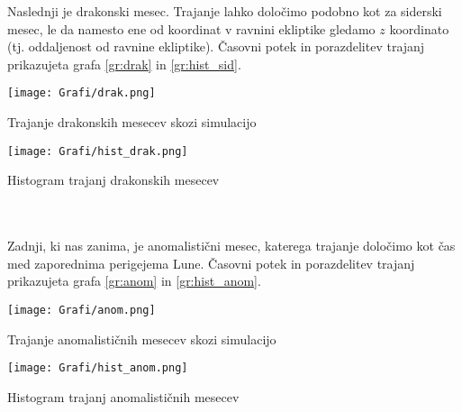 \documentclass{article}
\begin{document}
Naslednji je drakonski mesec. Trajanje lahko določimo podobno kot za siderski mesec, le da namesto ene od koordinat v ravnini ekliptike gledamo $z$ koordinato (tj. oddaljenost od ravnine ekliptike). Časovni potek in porazdelitev trajanj prikazujeta grafa \ref{gr:drak} in \ref{gr:hist_sid}.

\begin{minipage}[t]{0.45\textwidth}
    \begin{graph}
        \centering
        \texttt{[image: Grafi/drak.png]}
        \captionsetup{width=.8\linewidth}
        \caption{Trajanje drakonskih mesecev skozi simulacijo}
        \label{gr:drak}
    \end{graph}
\end{minipage}\begin{minipage}[t]{0.45\textwidth}
    \begin{graph}
        \centering
        \texttt{[image: Grafi/hist\_drak.png]}
        \captionsetup{width=.8\linewidth}
        \caption{Histogram trajanj drakonskih mesecev}
        \label{gr:hist_drak}
    \end{graph}
\end{minipage}\\\\

Zadnji, ki nas zanima, je anomalistični mesec, katerega trajanje določimo kot čas med zaporednima perigejema Lune. Časovni potek in porazdelitev trajanj prikazujeta grafa \ref{gr:anom} in \ref{gr:hist_anom}.

\begin{minipage}[t]{0.45\textwidth}
    \begin{graph}
        \centering
        \texttt{[image: Grafi/anom.png]}
        \captionsetup{width=.8\linewidth}
        \caption{Trajanje anomalističnih mesecev skozi simulacijo}
        \label{gr:anom}
    \end{graph}
\end{minipage}\begin{minipage}[t]{0.45\textwidth}
    \begin{graph}
        \centering
        \texttt{[image: Grafi/hist\_anom.png]}
        \captionsetup{width=.8\linewidth}
        \caption{Histogram trajanj anomalističnih mesecev}
        \label{gr:hist_anom}
    \end{graph}
\end{minipage}\\\\
\end{document}
